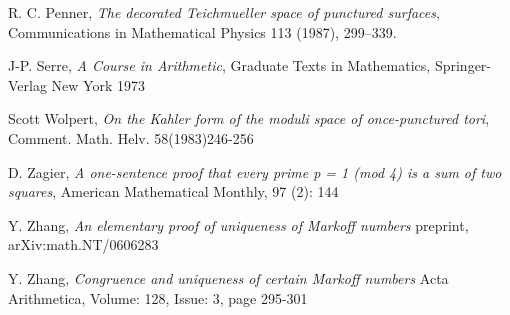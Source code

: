 \documentclass[12pt,a4paper]{amsart}
\begin{document}
R. C. Penner, 
\textit{The decorated Teichmueller space of punctured surfaces}, 
Communications in Mathematical Physics 113 (1987), 299–339.





J-P. Serre,
\textit{A Course in Arithmetic},
Graduate Texts in Mathematics,
Springer-Verlag New York
1973

Scott Wolpert,
\textit{On the Kahler form of the moduli space of once-punctured tori}, 
Comment. Math. Helv. 58(1983)246-256

D. Zagier,
 \textit{A one-sentence proof that every prime p = 1 (mod 4) is a sum of two squares}, 
 American Mathematical Monthly, 97 (2): 144
 
 Y. Zhang,
 \textit{ An elementary proof of uniqueness of Markoff numbers}
 preprint, arXiv:math.NT/0606283
 
   Y. Zhang,
 \textit{Congruence and uniqueness of certain Markoff numbers}
 Acta Arithmetica, Volume: 128, Issue: 3, page 295-301




%
%
%
%
%
%
%
%



% 
 
\end{document}
